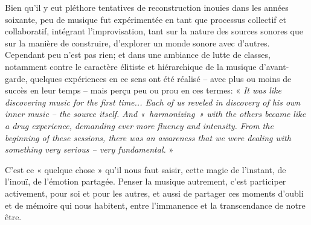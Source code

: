 Bien qu'il y eut pléthore tentatives de reconstruction inouïes dans les années soixante, peu de musique fut expérimentée en tant que processus collectif et collaboratif, intégrant l'improvisation, tant sur la nature des sources sonores que sur la manière de construire, d'explorer un monde sonore avec d'autres. Cependant peu n'est pas rien; et dans une ambiance de lutte de classes, notamment contre le caractère élitiste et hiérarchique de la musique d'avant-garde, 
quelques expériences en ce sens ont été réalisé -- avec plus ou moins de succès en leur temps -- mais perçu peu ou prou en ces termes:
« \textit{It was like discovering music for the first time... Each of us reveled in discovery of his own inner music -- the source itself. And \hbox{« harmonizing »} with the others became like a drug experience, demanding ever more fluency and intensity. From the beginning of these sessions, there was an awareness that we were dealing with something very serious – very fundamental.} »

C'est ce « quelque chose » qu'il nous faut saisir, cette magie de l'instant, de l'inouï, de l'émotion partagée. Penser la musique autrement, c'est participer activement, pour soi et pour les autres, et aussi de partager ces moments d'oubli et de mémoire qui nous habitent, entre l'immanence et la transcendance de notre être.

